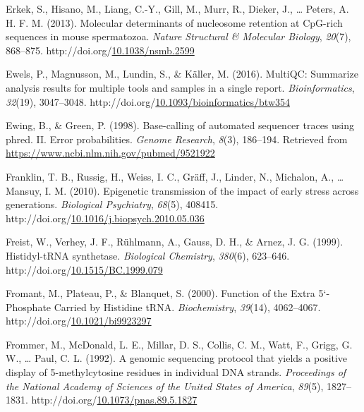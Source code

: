 \documentclass[12pt,twoside]{reedthesis}
\newlength{\cslhangindent}
\newenvironment{CSLReferences}[2] %
 {%
  \setlength{\parindent}{0pt}
  \ifodd #1 \everypar{\setlength{\hangindent}{\cslhangindent}}\ignorespaces\fi
  \ifnum #2 > 0
  \setlength{\parskip}{#2\baselineskip}
  \fi
 }%
 {}
\begin{document}
\begin{CSLReferences}{1}{0}
\leavevmode{}%
Erkek, S., Hisano, M., Liang, C.-Y., Gill, M., Murr, R., Dieker, J., \ldots{} Peters, A. H. F. M. (2013). Molecular determinants of nucleosome retention at CpG-rich sequences in mouse spermatozoa. \emph{Nature Structural \& Molecular Biology}, \emph{20}(7), 868--875. http://doi.org/\href{https://doi.org/10.1038/nsmb.2599}{10.1038/nsmb.2599}

\leavevmode{}%
Ewels, P., Magnusson, M., Lundin, S., \& Käller, M. (2016). MultiQC: Summarize analysis results for multiple tools and samples in a single report. \emph{Bioinformatics}, \emph{32}(19), 3047--3048. http://doi.org/\href{https://doi.org/10.1093/bioinformatics/btw354}{10.1093/bioinformatics/btw354}

\leavevmode{}%
Ewing, B., \& Green, P. (1998). Base-calling of automated sequencer traces using phred. II. Error probabilities. \emph{Genome Research}, \emph{8}(3), 186--194. Retrieved from \url{https://www.ncbi.nlm.nih.gov/pubmed/9521922}

\leavevmode{}%
Franklin, T. B., Russig, H., Weiss, I. C., Gräff, J., Linder, N., Michalon, A., \ldots{} Mansuy, I. M. (2010). Epigenetic transmission of the impact of early stress across generations. \emph{Biological Psychiatry}, \emph{68}(5), 408415. http://doi.org/\href{https://doi.org/10.1016/j.biopsych.2010.05.036}{10.1016/j.biopsych.2010.05.036}

\leavevmode{}%
Freist, W., Verhey, J. F., Rühlmann, A., Gauss, D. H., \& Arnez, J. G. (1999). Histidyl-tRNA synthetase. \emph{Biological Chemistry}, \emph{380}(6), 623--646. http://doi.org/\href{https://doi.org/10.1515/BC.1999.079}{10.1515/BC.1999.079}

\leavevmode{}%
Fromant, M., Plateau, P., \& Blanquet, S. (2000). Function of the Extra 5{`}-Phosphate Carried by Histidine tRNA. \emph{Biochemistry}, \emph{39}(14), 4062--4067. http://doi.org/\href{https://doi.org/10.1021/bi9923297}{10.1021/bi9923297}

\leavevmode{}%
Frommer, M., McDonald, L. E., Millar, D. S., Collis, C. M., Watt, F., Grigg, G. W., \ldots{} Paul, C. L. (1992). A genomic sequencing protocol that yields a positive display of 5-methylcytosine residues in individual DNA strands. \emph{Proceedings of the National Academy of Sciences of the United States of America}, \emph{89}(5), 1827--1831. http://doi.org/\href{https://doi.org/10.1073/pnas.89.5.1827}{10.1073/pnas.89.5.1827}


\end{CSLReferences}
\end{document}

